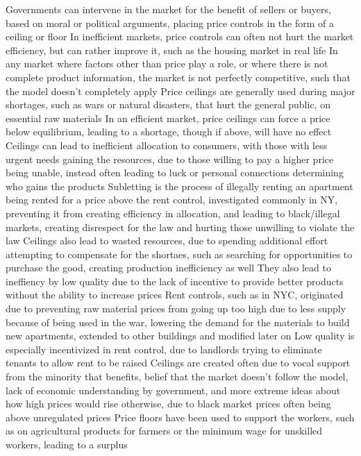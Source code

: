 \documentclass[11 pt, twoside]{article}
\newenvironment{outline*}
{
	\begin{outline}[enumerate]
	}
	{\end{outline}
}
\begin{document}
\begin{outline*}
\1 Governments can intervene in the market for the benefit of sellers or buyers, based on moral or political arguments, placing price controls in the form of a ceiling or floor
\2 In inefficient markets, price controls can often not hurt the market efficiency, but can rather improve it, such as the housing market in real life
\2 In any market where factors other than price play a role, or where there is not complete product information, the market is not perfectly competitive, such that the model doesn't completely apply
\1 Price ceilings are generally used during major shortages, such as wars or natural disasters, that hurt the general public, on essential raw materials
\2 In an efficient market, price ceilings can force a price below equilibrium, leading to a shortage, though if above, will have no effect
\2 Ceilings can lead to inefficient allocation to consumers, with those with less urgent needs gaining the resources, due to those willing to pay a higher price being unable, instead often leading to luck or personal connections determining who gains the products
\2 Subletting is the process of illegally renting an apartment being rented for a price above the rent control, investigated commonly in NY, preventing it from creating efficiency in allocation, and leading to black/illegal markets, creating disrespect for the law and hurting those unwilling to violate the law
\2 Ceilings also lead to wasted resources, due to spending additional effort attempting to compensate for the shortaes, such as searching for opportunities to purchase the good, creating production inefficiency as well
\2 They also lead to ineffiency by low quality due to the lack of incentive to provide better products without the ability to increase prices
\1 Rent controls, such as in NYC, originated due to preventing raw material prices from going up too high due to less supply because of being used in the war, lowering the demand for the materials to build new apartments, extended to other buildings and modified later on
\2 Low quality is especially incentivized in rent control, due to landlords trying to eliminate tenants to allow rent to be raised
\1 Ceilings are created often due to vocal support from the minority that benefits, belief that the market doesn't follow the model, lack of economic understanding by government, and more extreme ideas about how high prices would rise otherwise, due to black market prices often being above unregulated prices
\1 Price floors have been used to support the workers, such as on agricultural products for farmers or the minimum wage for unskilled workers, leading to a surplus

\end{outline*}
\end{document}
